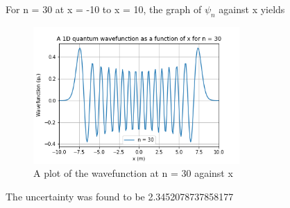 \documentclass[11pt]{article}
\begin{document}
For n = 30 at x = -10 to x = 10, the graph of $\psi_{n}$ against x yields
\begin{figure}[!h]\begin{center} 
		\vspace{12pt}
		\includegraphics[width=0.7\textwidth]{oscillator_wavefunction_n_30.png} 
		\caption{A plot of the wavefunction at n = 30 against x }
		\label{fig:oscillator_n30} 
	\end{center}
\end{figure}
 The uncertainty was found to be 2.3452078737858177
	
\end{document}
